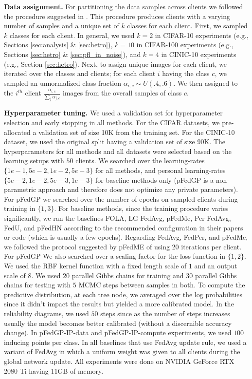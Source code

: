 \documentclass{article}
\begin{document}
\textbf{Data assignment.} For partitioning the data samples across clients we followed the procedure suggested in \cite{shamsian2021personalized_icml, t2020personalized}. This procedure produces clients with a varying number of samples and a unique set of $k$ classes for each client. First, we sampled $k$ classes for each client. In general, we used $k=2$ in CIFAR-10 experiments (e.g., Sections \ref{sec:analysis} \& \ref{sec:hetro}), $k=10$ in CIFAR-100 experiments (e.g., Sections \ref{sec:hetro} \& \ref{sec:pfl_in_noise}), and $k=4$ in CINIC-10 experiments (e.g., Section \ref{sec:hetro}). Next, to assign unique images for each client, we iterated over the classes and clients; for each client $i$ having the class $c$, we sampled an unnormalized class fraction $\alpha_{i,c}\sim U(.4,.6)$. We then assigned to the $i^{th}$ client $\frac{\alpha_{i,c}}{\sum_j \alpha_{j,c}}$ images from the overall samples of class $c$.

\textbf{Hyperparameter tuning.} We used a validation set for hyperparameter selection and early stopping in all methods. For the CIFAR datasets, we pre-allocated a validation set of size 10K from the training set. For the CINIC-10 dataset, we used the original split having a validation set of size 90K. The hyperparameters for all methods and all datasets were selected based on the learning setups with $50$ clients. We searched over the learning-rates $\{1e-1, 5e-2, 1e-2, 5e-3\}$ for all methods, and personal learning-rates $\{5e-2, 1e-2, 5e-3, 1e-3\}$ for baseline methods only (pFedGP is a non-parametric approach and therefore does not optimize any private parameters). For pFedGP we searched over the number of epochs on sampled clients during training in $\{1, 3\}$. For baseline methods, since the training procedure varies significantly, we ran the baselines FOLA, LG-FedAvg, pFedMe, Per-FedAvg, FedU, and pFedHN according to the recommended configuration in their papers or code (which is usually a few epochs). Regarding FedAvg, FedPer, and pFedMe, we followed the protocol suggested by pFedME of using 20 iterations per client. For pFedGP We also searched over a scaling factor for the loss function in $\{1, 2\}$. We used the RBF kernel function with a fixed length scale of $1$ and an output scale of $8$. We used $20$ parallel Gibbs chains for training and $30$ parallel Gibbs chains for testing with $5$ MCMC steps between samples in both. To compute the predictive distribution, at each tree node, we averaged over the log probabilities since it didn't impact the results but yielded a more calibrated model. In the reliability diagrams, we used $50$ steps since as the number of steps increases usually the model becomes better calibrated (without a discernible accuracy change). In pFedGP-IP-data and pFedGP-IP-compute experiments, we used $100$ inducing points per class. In all baselines that use FedAvg update rule, we used a variant of FedAvg in which a uniform weight was given to all clients during the global network update.
All experiments were done on NVIDIA GeForce RTX 2080 Ti having 11GB of memory.
\end{document}
